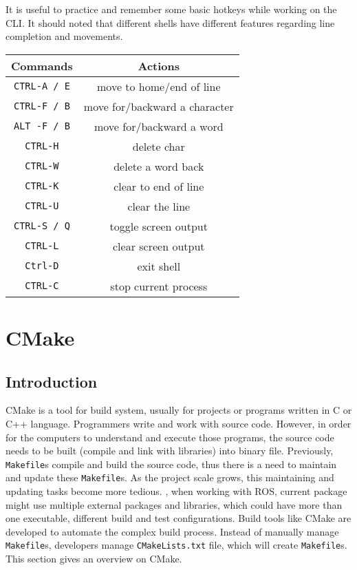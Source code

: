 It is useful to practice and remember some basic hotkeys while working on the \ac{CLI}. It should noted that different shells have different features regarding line completion and movements.

\begin{table}[hbt!]
	\centering
	\begin{tabular}{c|c}
		Commands   & Actions                           \\
		\hline\hline
		\verb|CTRL-A / E| & move to home/end of line       \\
		\verb|CTRL-F / B| & move for/backward a character   \\
		\verb|ALT -F / B| & move for/backward a word   \\
		\verb|CTRL-H| & delete char                  \\
		\verb|CTRL-W| & delete a word back             \\
		\verb|CTRL-K| & clear to end of line\\
		\verb|CTRL-U| & clear the line                   \\
		\verb|CTRL-S / Q| & toggle screen output       \\
		\verb|CTRL-L| & clear screen output            \\
		\verb|Ctrl-D| & exit shell                     \\
		\verb|CTRL-C| & stop current process          
	\end{tabular}
\end{table}

\section{CMake}

\subsection{Introduction}
CMake is a tool for build system, usually for projects or programs written in C or C++ language. Programmers write and work with source code. However, in order for the computers to understand and execute those programs, the source code needs to be built (compile and link with libraries) into binary file. Previously, \texttt{Makefile}s compile and build the source code, thus there is a need to maintain and update these \texttt{Makefile}s. As the project scale grows, this maintaining and updating tasks become more tedious. \Eg, when working with ROS, current package might use multiple external packages and libraries, which could have more than one executable, different build and test configurations. Build tools like CMake are developed to automate the complex build process. Instead of manually manage \texttt{Makefile}s, developers manage \texttt{CMakeLists.txt} file, which will create \texttt{Makefile}s. This section gives an overview on CMake.\\

